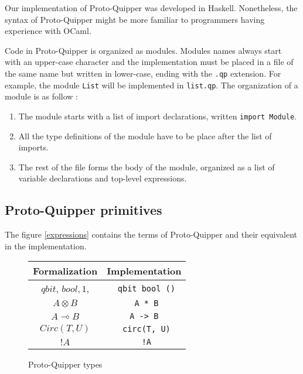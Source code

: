 

Our implementation of Proto-Quipper was developed in Haskell. 
Nonetheless, the syntax of Proto-Quipper might be more familiar 
to programmers having experience with OCaml.

Code in Proto-Quipper is organized as modules. Modules names 
always start with an upper-case character and the implementation 
must be placed in a file of the same name but written in lower-case, 
ending with the {\tt.qp} extension. For example, the module {\tt List} 
will be implemented in {\tt list.qp}.
The organization of a module is as follow :
	\begin{enumerate}
		\item The module starts with a list of import declarations, written {\tt import Module}.
		\item All the type definitions of the module have to be place after the list of imports.
		\item The rest of the file forms the body of the module, organized as a list of variable declarations and
			top-level expressions.
	\end{enumerate}

\subsection{Proto-Quipper primitives}

The figure \ref{expressions} contains the terms of Proto-Quipper and their equivalent in the implementation.

\begin{figure}[!ht]
\begin{center}
\begin{tabular}{|c|c|}
	\hline
	Formalization & Implementation \\\hline
	$qbit$, $bool, 1$, & \verb# qbit bool ()# \\\hline
	$A \otimes B$ & \verb# A * B# \\\hline
	$A \multimap B$ & \verb# A -> B # \\\hline
	$Circ(T, U)$ & \verb# circ(T, U)# \\\hline
	${!} A$ & \verb# !A# \\\hline
\end{tabular}
\end{center}
\label{types}
\caption{Proto-Quipper types}
\end{figure}

